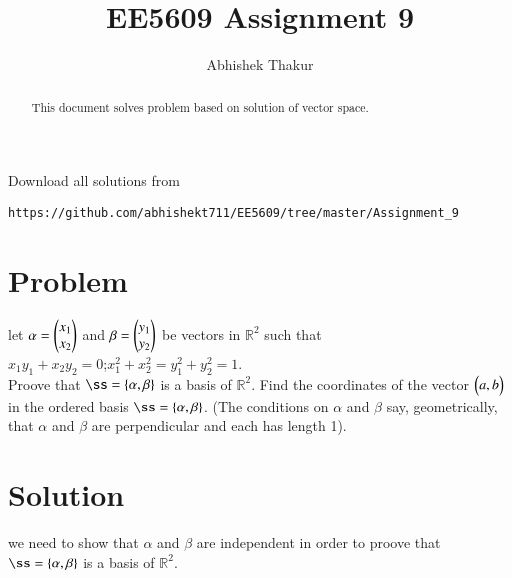 \documentclass[journal,12pt,twocolumn]{IEEEtran}
\begin{document}
     \def\rightbox#1{\makebox[0in][r]{#1}}
     \def\centbox#1{\makebox[0in]{#1}}
     \def\topbox#1{\raisebox{-\baselineskip}[0in][0in]{#1}}
     \def\midbox#1{\raisebox{-0.5\baselineskip}[0in][0in]{#1}}
\vspace{3cm}
\title{EE5609 Assignment 9}
\author{Abhishek Thakur}
\maketitle
\newpage
\bigskip
\renewcommand{\thefigure}{\theenumi}
\renewcommand{\thetable}{\theenumi}
\begin{abstract}
This document solves problem based on solution of vector space.
\end{abstract}
Download all solutions from 
\begin{lstlisting}
https://github.com/abhishekt711/EE5609/tree/master/Assignment_9
\end{lstlisting}
\section{Problem}
let $\alpha=\begin{pmatrix}x_1\\x_2\end{pmatrix}$ and $\beta=\begin{pmatrix}y_1\\y_2\end{pmatrix}$ be vectors in $\mathbb{R}^2$ such that\\
$x_1y_1+x_2y_2=0$;\quad $x_1^2+x_2^2=y_1^2+y_2^2=1$.\\
Proove that $\ss=\{\vec{\alpha},\vec{\beta}\}$ is a basis of $\mathbb{R}^2$. Find the coordinates of the vector $\begin{pmatrix}a,b\end{pmatrix}$ in the ordered basis $\ss=\{\vec{\alpha},\vec{\beta}\}$. (The conditions on $\alpha$ and $\beta$ say, geometrically, that $\alpha$ and $\beta$ are perpendicular and each has length 1).
\section{Solution}
we need to show that $\alpha$ and $\beta$ are independent in order to proove that $\ss=\{\vec{\alpha},\vec{\beta}\}$ is a basis of $\mathbb{R}^2$.\\
\end{document}
